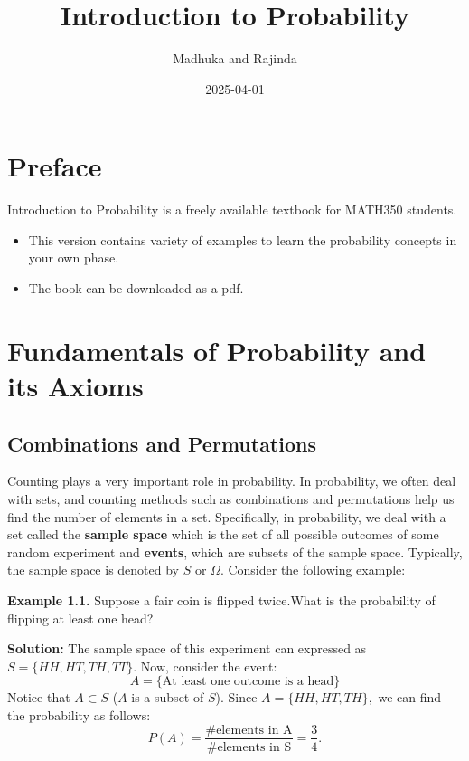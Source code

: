 \documentclass[
]{book}
\title{Introduction to Probability}
\author{Madhuka and Rajinda}
\date{2025-04-01}
\providecommand{\tightlist}{%
  \setlength{\itemsep}{0pt}\setlength{\parskip}{0pt}}
\begin{document}
\maketitle

{
\setcounter{tocdepth}{2}
\tableofcontents
}
\hypertarget{preface}{%
\chapter*{Preface}\label{preface}}


Introduction to Probability is a freely available textbook for MATH350 students.

\begin{itemize}
\tightlist
\item
  This version contains variety of examples to learn the probability concepts in your own phase.
\item
  The book can be downloaded as a pdf.
\end{itemize}

\hypertarget{fundamentals-of-probability-and-its-axioms}{%
\chapter{Fundamentals of Probability and its Axioms}\label{fundamentals-of-probability-and-its-axioms}}

\hypertarget{combinations-and-permutations}{%
\section{Combinations and Permutations}\label{combinations-and-permutations}}

Counting plays a very important role in probability. In probability, we often deal with sets, and counting methods such as combinations and permutations help us find the number of elements in a set. Specifically, in probability, we deal with a set called the \textbf{sample space} which is the set of all possible outcomes of some random experiment and \textbf{events}, which are subsets of the sample space. Typically, the sample space is denoted by \(S\) or \(\Omega.\) Consider the following example:

\textbf{Example 1.1.}
Suppose a fair coin is flipped twice.What is the probability of flipping at least one head?

\textbf{Solution:}
The sample space of this experiment can expressed as \(S=\{HH,HT,TH,TT\}\). Now, consider the event:
\[A=\{\text{At least one outcome is a head}\}\]
Notice that \(A\subset S\) (\(A\) is a subset of \(S\)). Since \(A=\{HH,HT,TH\},\) we can find the probability as follows:
\[P(A)= \frac{\#\text{elements in A}}{\#\text{elements in S}}=\frac{3}{4}.\]
\end{document}
